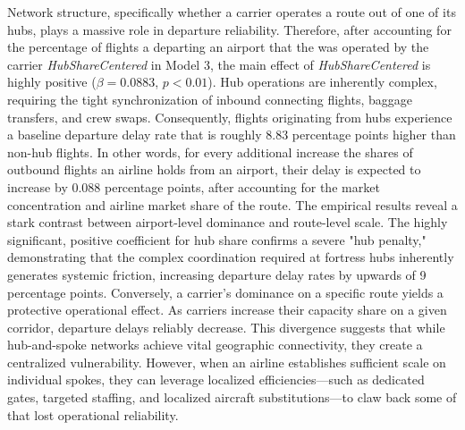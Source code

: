 \documentclass[preprint,12pt,authoryear]{elsarticle}
\begin{document}
Network structure, specifically whether a carrier operates a route out of one of its hubs, plays a massive role in departure reliability. Therefore, after accounting for the percentage of flights a departing an airport that the was operated by the carrier \textit{HubShareCentered} in Model 3, the main effect of \textit{HubShareCentered} is highly positive ($\beta = 0.0883$, $p < 0.01$). Hub operations are inherently complex, requiring the tight synchronization of inbound connecting flights, baggage transfers, and crew swaps. Consequently, flights originating from hubs experience a baseline departure delay rate that is roughly 8.83 percentage points higher than non-hub flights. In other words, for every additional increase the shares of outbound flights an airline holds from an airport, their delay is expected to increase by 0.088 percentage points, after accounting for the market concentration and airline market share of the route. The empirical results reveal a stark contrast between airport-level dominance and route-level scale. The highly significant, positive coefficient for hub share confirms a severe "hub penalty," demonstrating that the complex coordination required at fortress hubs inherently generates systemic friction, increasing departure delay rates by upwards of 9 percentage points. Conversely, a carrier’s dominance on a specific route yields a protective operational effect. As carriers increase their capacity share on a given corridor, departure delays reliably decrease. This divergence suggests that while hub-and-spoke networks achieve vital geographic connectivity, they create a centralized vulnerability. However, when an airline establishes sufficient scale on individual spokes, they can leverage localized efficiencies—such as dedicated gates, targeted staffing, and localized aircraft substitutions—to claw back some of that lost operational reliability.
\end{document}
